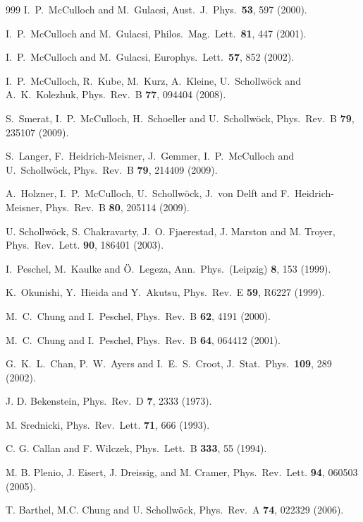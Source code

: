 \documentclass[a4paper,10pt,oneside,onecolumn,1p,times]{elsarticle}
\begin{document}
\begin{thebibliography}{999}
 I.~P.~McCulloch and M.~Gulacsi, Aust.\ J.\ Phys.\ {\bf 53}, 597 (2000).

 I.~P.~McCulloch and M.~Gulacsi, Philos.\ Mag.\ Lett.\ {\bf 81}, 447 (2001).

 I.~P.~McCulloch and M.~Gulacsi, Europhys.\ Lett.\ {\bf 57}, 852 (2002).

 I.~P.~McCulloch, R.~Kube, M.~Kurz, A.~Kleine, U.~Schollw\"{o}ck and A.~K.~Kolezhuk, Phys.\ Rev.\ B {\bf 77}, 094404 (2008).

 S.~Smerat, I.~P.~McCulloch, H.~Schoeller and U.~Schollw\"{o}ck,
Phys.\ Rev.\ B {\bf 79}, 235107 (2009).

 S.~Langer, F.~Heidrich-Meisner, J.~Gemmer, I.~P.~McCulloch and U.~Schollw\"{o}ck,
Phys.\ Rev.\ B {\bf 79}, 214409 (2009).

 A.~Holzner, I.~P.~McCulloch,  U.~Schollw\"{o}ck, J.~von Delft and F.~Heidrich-Meisner,
Phys.\ Rev.\ B {\bf 80}, 205114 (2009).

U. Schollw\"{o}ck, S. Chakravarty, J.~O. Fjaerestad, J. Marston and M. Troyer,
Phys.\ Rev.\ Lett. {\bf 90}, 186401 (2003).

I.~Peschel, M.~Kaulke and \"{O}.~Legeza, Ann.\ Phys.\ (Leipzig) {\bf 8}, 153 (1999).

K.~Okunishi, Y.~Hieida and Y.~Akutsu, Phys.\ Rev.\ E {\bf 59}, R6227 (1999).

M.~C.~Chung and I.~Peschel, Phys.\ Rev.\ B {\bf 62}, 4191 (2000).

M.~C.~Chung and I.~Peschel, Phys.\ Rev.\ B {\bf 64}, 064412 (2001).

G.~K.~L.~Chan, P.~W.~Ayers and I.~E.~S.~Croot, J.\ Stat.\ Phys.\ {\bf 109}, 289 (2002). 

J. D. Bekenstein, Phys.\ Rev.\ D {\bf 7}, 2333 (1973).

M. Srednicki, Phys.\ Rev.\ Lett. {\bf 71}, 666 (1993).

C. G. Callan and F. Wilczek, Phys.\ Lett.\ B {\bf 333}, 55 (1994).

M. B. Plenio, J. Eisert, J. Dreissig, and M. Cramer, Phys.\ Rev.\ Lett. {\bf 94}, 
060503 (2005).

T. Barthel, M.C. Chung and U. Schollw\"{o}ck, Phys.\ Rev.\ A {\bf 74}, 022329 (2006).


\end{thebibliography}
\end{document}
